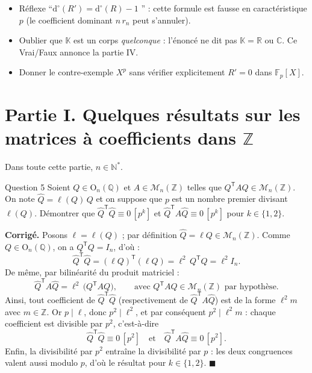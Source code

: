 \documentclass[11pt,a4paper]{article}
\newenvironment{corrige}
  {\par\medskip\noindent
   \begin{tcolorbox}[blanker, breakable,
     borderline west={2.5pt}{0pt}{vertP},
     left=10pt, top=2pt, bottom=2pt]
   {\color{vertP}\bfseries Corrigé.}\hspace{0.5em}\ignorespaces}
  {\hfill$\blacksquare$\end{tcolorbox}\medskip}
\newcommand{\og}{``}
\newcommand{\fg}{''}
\newcommand{\K}{\mathbb{K}}
\newcommand{\Z}{\mathbb{Z}}
\newcommand{\Q}{\mathbb{Q}}
\newcommand{\R}{\mathbb{R}}
\newcommand{\N}{\mathbb{N}}
\newcommand{\Fp}{\mathbb{F}_p}
\newcommand{\Mn}[1][n]{\mathcal{M}_{#1}}
\newcommand{\On}[1][n]{\mathrm{O}_{#1}}
\newcommand{\dg}[1]{\mathrm{d}^{\circ}\!\left(#1\right)}
\newcommand{\T}{\mathsf{T}}               %
\begin{document}
\begin{pieges}
\begin{itemize}[leftmargin=1.4em, itemsep=2pt]
\item Réflexe \og $\dg{R'}=\dg{R}-1$ \fg{} : cette formule est fausse
en caractéristique $p$ (le coefficient dominant $n\,r_n$ peut
s'annuler).
\item Oublier que $\K$ est un corps \emph{quelconque} : l'énoncé ne dit
pas $\K=\R$ ou $\mathbb{C}$. Ce Vrai/Faux annonce la partie IV.
\item Donner le contre-exemple $X^p$ sans vérifier explicitement
$R'=0$ dans $\Fp[X]$.
\end{itemize}
\end{pieges}

\section{Partie I. Quelques résultats sur les matrices à coefficients
dans $\Z$}
Dans toute cette partie, $n\in\N^{*}$.

\begin{enonce}{Question 5}
Soient $Q\in\On(\Q)$ et $A\in\Mn(\Z)$ telles que $Q^{\T}AQ\in\Mn(\Z)$.
On note $\widehat{Q}=\ell(Q)\,Q$ et on suppose que $p$ est un nombre
premier divisant $\ell(Q)$. Démontrer que
$\widehat{Q}^{\T}\widehat{Q}\equiv 0\,[p^{k}]$ et
$\widehat{Q}^{\T}A\widehat{Q}\equiv 0\,[p^{k}]$ pour $k\in\{1,2\}$.
\end{enonce}

\begin{corrige}
Posons $\ell=\ell(Q)$ ; par définition
$\widehat{Q}=\ell Q\in\Mn(\Z)$. Comme $Q\in\On(\Q)$, on a
$Q^{\T}Q=I_n$, d'où :
\[
\widehat{Q}^{\T}\widehat{Q}
=(\ell Q)^{\T}(\ell Q)
=\ell^{2}\,Q^{\T}Q
=\ell^{2}I_n .
\]
De même, par bilinéarité du produit matriciel :
\[
\widehat{Q}^{\T}A\widehat{Q}=\ell^{2}\,\big(Q^{\T}AQ\big),
\qquad\text{avec }Q^{\T}AQ\in\Mn(\Z)\text{ par hypothèse.}
\]
Ainsi, tout coefficient de $\widehat{Q}^{\T}\widehat{Q}$
(respectivement de $\widehat{Q}^{\T}A\widehat{Q}$) est de la forme
$\ell^{2}m$ avec $m\in\Z$. Or $p\mid\ell$, donc $p^{2}\mid\ell^{2}$,
et par conséquent $p^{2}\mid\ell^{2}m$ : chaque coefficient est
divisible par $p^{2}$, c'est-à-dire
\[
\widehat{Q}^{\T}\widehat{Q}\equiv 0\,[p^{2}]
\quad\text{et}\quad
\widehat{Q}^{\T}A\widehat{Q}\equiv 0\,[p^{2}].
\]
Enfin, la divisibilité par $p^{2}$ entraîne la divisibilité par $p$ :
les deux congruences valent aussi modulo $p$, d'où le résultat pour
$k\in\{1,2\}$.
\end{corrige}
\end{document}
